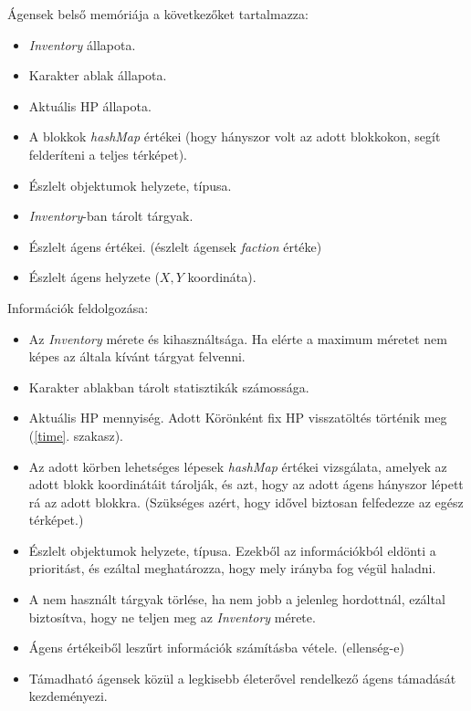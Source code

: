 \noindent Ágensek belső memóriája a következőket tartalmazza:
\begin{itemize}
    \item \textit{Inventory} állapota.
    \item Karakter ablak állapota.
    \item Aktuális HP állapota.
    \item A blokkok \textit{hashMap} értékei (hogy hányszor volt az adott blokkokon, segít felderíteni a teljes térképet).
    \item Észlelt objektumok helyzete, típusa.
    \item \textit{Inventory}-ban tárolt tárgyak.
    \item Észlelt ágens értékei. (észlelt ágensek \textit{faction} értéke)
    \item Észlelt ágens helyzete ($X, Y$ koordináta).
\end{itemize}


Információk feldolgozása:
\begin{itemize}
    \item Az \textit{Inventory} mérete és kihasználtsága. Ha elérte a maximum méretet nem képes az általa kívánt tárgyat felvenni.
    \item Karakter ablakban tárolt statisztikák számossága.
    \item Aktuális HP mennyiség. Adott Körönként fix HP visszatöltés történik meg (\ref{time}. szakasz).
    \item Az adott körben lehetséges lépesek \textit{hashMap} értékei vizsgálata, amelyek az adott blokk koordinátáit tárolják, és azt, hogy az adott ágens hányszor lépett rá az adott blokkra. (Szükséges azért, hogy idővel biztosan felfedezze az egész térképet.)
    \item Észlelt objektumok helyzete, típusa. Ezekből az információkból eldönti a prioritást, és ezáltal meghatározza, hogy mely irányba fog végül haladni.
    \item A nem használt tárgyak törlése, ha nem jobb a jelenleg hordottnál, ezáltal biztosítva, hogy ne teljen meg az \textit{Inventory} mérete.
    \item Ágens értékeiből leszűrt információk számításba vétele. (ellenség-e)
    \item Támadható ágensek közül a legkisebb életerővel rendelkező ágens támadását kezdeményezi.
\end{itemize}

